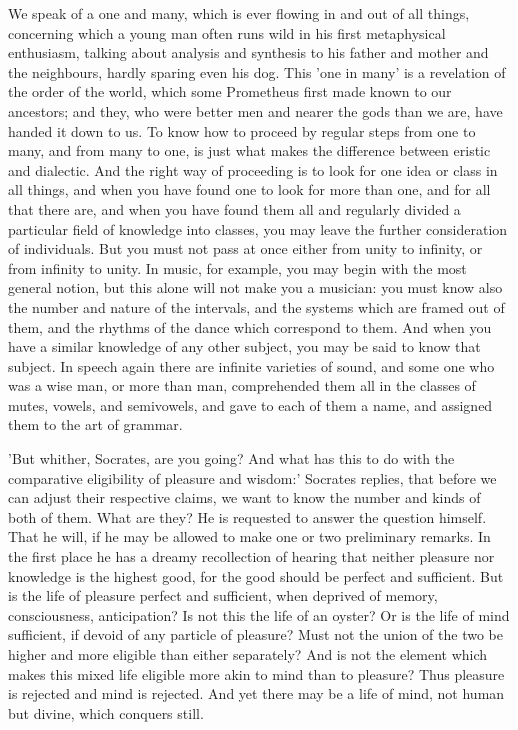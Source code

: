 \documentclass[11pt,letter]{article}
\begin{document}
\par  We speak of a one and many, which is ever flowing in and out of all things, concerning which a young man often runs wild in his first metaphysical enthusiasm, talking about analysis and synthesis to his father and mother and the neighbours, hardly sparing even his dog. This 'one in many' is a revelation of the order of the world, which some Prometheus first made known to our ancestors; and they, who were better men and nearer the gods than we are, have handed it down to us. To know how to proceed by regular steps from one to many, and from many to one, is just what makes the difference between eristic and dialectic. And the right way of proceeding is to look for one idea or class in all things, and when you have found one to look for more than one, and for all that there are, and when you have found them all and regularly divided a particular field of knowledge into classes, you may leave the further consideration of individuals. But you must not pass at once either from unity to infinity, or from infinity to unity. In music, for example, you may begin with the most general notion, but this alone will not make you a musician: you must know also the number and nature of the intervals, and the systems which are framed out of them, and the rhythms of the dance which correspond to them. And when you have a similar knowledge of any other subject, you may be said to know that subject. In speech again there are infinite varieties of sound, and some one who was a wise man, or more than man, comprehended them all in the classes of mutes, vowels, and semivowels, and gave to each of them a name, and assigned them to the art of grammar.

\par  'But whither, Socrates, are you going? And what has this to do with the comparative eligibility of pleasure and wisdom:' Socrates replies, that before we can adjust their respective claims, we want to know the number and kinds of both of them. What are they? He is requested to answer the question himself. That he will, if he may be allowed to make one or two preliminary remarks. In the first place he has a dreamy recollection of hearing that neither pleasure nor knowledge is the highest good, for the good should be perfect and sufficient. But is the life of pleasure perfect and sufficient, when deprived of memory, consciousness, anticipation? Is not this the life of an oyster? Or is the life of mind sufficient, if devoid of any particle of pleasure? Must not the union of the two be higher and more eligible than either separately? And is not the element which makes this mixed life eligible more akin to mind than to pleasure? Thus pleasure is rejected and mind is rejected. And yet there may be a life of mind, not human but divine, which conquers still.
\end{document}
